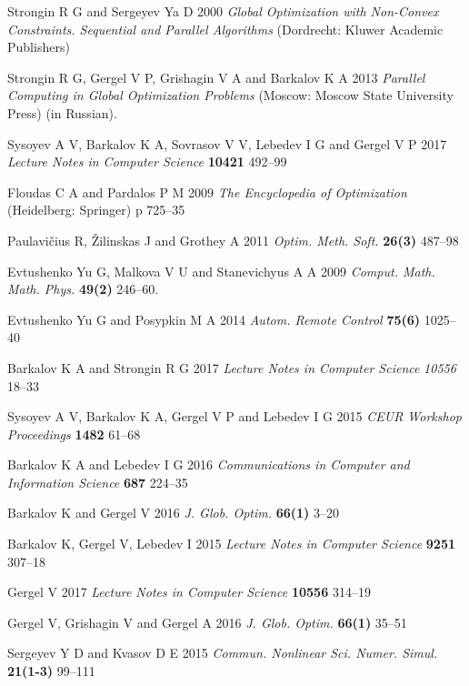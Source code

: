 \documentclass[a4paper]{jpconf}
\begin{document}
\begin{thebibliography}{9}

Strongin R G and Sergeyev Ya D 2000 \textit{Global Optimization with Non-Convex Constraints. Sequential 
and Parallel Algorithms} (Dordrecht: Kluwer Academic Publishers)

Strongin R G, Gergel V P, Grishagin V A and Barkalov K A 2013  \textit{Parallel Computing in Global Optimization Problems} (Moscow: Moscow State University Press) (in Russian).

Sysoyev A V, Barkalov K A, Sovrasov V V, Lebedev I G and Gergel V P 2017 \textit{Lecture Notes in Computer Science} \textbf{10421} 492--99

Floudas C A and Pardalos P M 2009 \textit{The Encyclopedia of Optimization } (Heidelberg: Springer) p 725--35 

Paulavi\v{c}ius R, \v{Z}ilinskas J and Grothey A 2011 \textit{Optim. Meth. Soft.} \textbf{26(3)} 487--98

Evtushenko Yu G, Malkova V U and Stanevichyus A A 2009 \textit{Comput. Math. Math. Phys.} \textbf{49(2)} 246--60.

Evtushenko Yu G and Posypkin M A 2014 \textit{Autom. Remote Control} \textbf{75(6)} 1025--40

Barkalov K A and Strongin R G 2017 \textit{Lecture Notes in Computer Science} \textit{10556} 18--33

Sysoyev A V, Barkalov K A, Gergel V P and Lebedev I G 2015 \textit{CEUR Workshop Proceedings} \textbf{1482} 61--68

Barkalov K A and Lebedev I G 2016 \textit{Communications in Computer and Information Science} \textbf{687} 224--35

Barkalov K and Gergel V 2016 \textit{J. Glob. Optim.} \textbf{66(1)} 3--20

Barkalov K, Gergel V, Lebedev I 2015 \textit{Lecture Notes in Computer Science} \textbf{9251} 307--18

Gergel V 2017 \textit{Lecture Notes in Computer Science} \textbf{10556} 314--19

Gergel V, Grishagin V and Gergel A 2016 \textit{J. Glob. Optim.} \textbf{66(1)} 35--51

Sergeyev Y D and Kvasov D E 2015 \textit{Commun. Nonlinear Sci. Numer. Simul.} \textbf{21(1-3)} 99--111

\end{thebibliography}
\end{document}
